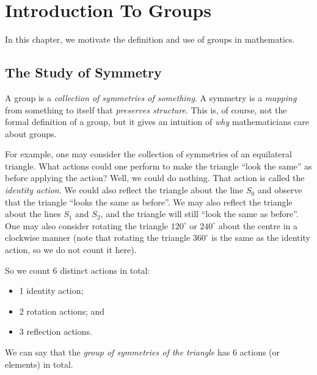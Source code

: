 \chapter{Introduction To Groups}
In this chapter, we motivate the definition and use of groups in mathematics.

\section{The Study of Symmetry}
A group is a \textit{collection of symmetries of something}. A symmetry is a \textit{mapping} from something to itself that \textit{preserves structure}. This is, of course, not the formal definition of a group, but it gives an intuition of \textit{why} mathematicians care about groups.

\begin{figure}
    \centering
\end{figure}

For example, one may consider the collection of symmetries of an equilateral triangle. What actions could one perform to make the triangle ``look the same'' as before applying the action? Well, we could do nothing. That action is called the \textit{identity action}. We could also reflect the triangle about the line $S_0$ and observe that the triangle ``looks the same as before''. We may also reflect the triangle about the lines $S_1$ and $S_2$, and the triangle will still ``look the same as before''. One may also consider rotating the triangle $120^\circ$ or $240^\circ$ about the centre in a clockwise manner (note that rotating the triangle $360^\circ$ is the same as the identity action, so we do not count it here).

\newpage

So we count 6 distinct actions in total:
\begin{itemize}
    \item 1 identity action;
    \item 2 rotation actions; and
    \item 3 reflection actions.
\end{itemize}
We can say that the \textit{group of symmetries of the triangle} has 6 actions (or elements) in total.

